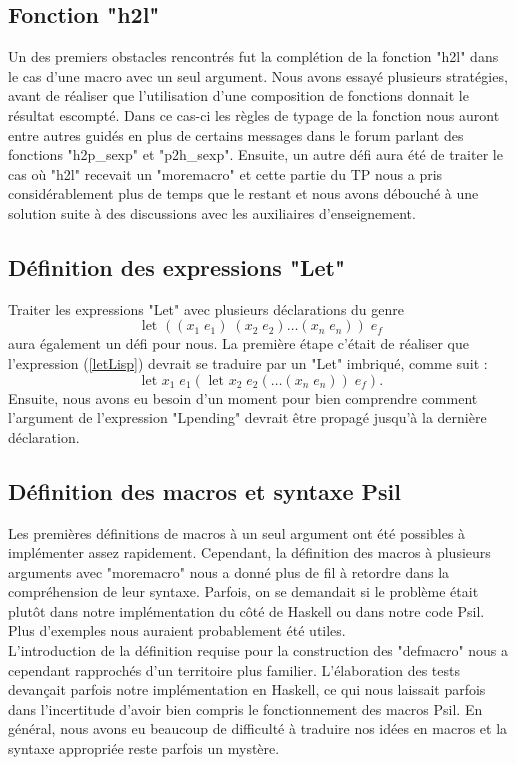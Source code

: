 \documentclass[11pt, letterpaper]{article}
\begin{document}
 \subsection{Fonction "h2l"} 
 Un des premiers obstacles rencontrés fut la complétion de la fonction "h2l" dans le cas d'une macro avec un seul argument. Nous avons essayé plusieurs stratégies, avant de réaliser que l'utilisation d'une composition de fonctions donnait le résultat escompté. Dans ce cas-ci les règles de typage de la fonction nous auront entre autres guidés en plus de certains messages dans le forum parlant des fonctions "h2p\_sexp" et "p2h\_sexp". Ensuite, un autre défi aura été de traiter le cas où "h2l" recevait un "moremacro" et cette partie du TP nous a pris considérablement plus de temps que le restant et nous avons débouché à une solution suite à des discussions avec les auxiliaires d'enseignement.
 
 \subsection{Définition des expressions "Let"} 
 Traiter les expressions "Let" avec plusieurs déclarations du genre
 \begin{equation}\label{letLisp}
  \mbox{ let } ((x_1 \; e_1) \; (x_2 \; e_2) \ldots (x_n \; e_n)) \; e_f
 \end{equation}
 aura également un défi pour nous. La première étape c'était de réaliser que l'expression (\ref{letLisp})
 devrait se traduire par un "Let" imbriqué, comme suit :
 \begin{equation*}
  \mbox{ let } x_1 \; e_1 ( \mbox{ let } x_2 \; e_2 ( \ldots (x_n \; e_n))\; e_f).
 \end{equation*}
 Ensuite, nous avons eu besoin d'un moment pour bien comprendre comment l'argument de l'expression "Lpending" devrait être propagé jusqu'à la dernière déclaration.
 
 \subsection{Définition des macros et syntaxe Psil} 
 Les premières définitions de macros à un seul argument ont été possibles à implémenter assez rapidement. Cependant, la définition des macros à plusieurs arguments avec "moremacro" nous a donné plus de fil à retordre dans la compréhension de leur syntaxe. Parfois, on se demandait si le problème était plutôt dans notre implémentation du côté de Haskell ou dans notre code Psil. Plus d'exemples nous auraient probablement été utiles.\\ 
 L'introduction de la définition requise pour la construction des "defmacro" nous a cependant rapprochés d'un territoire plus familier. L'élaboration des tests devançait parfois notre implémentation en Haskell, ce qui nous laissait parfois dans l'incertitude d'avoir bien compris le fonctionnement des macros Psil. En général, nous avons eu beaucoup de difficulté à traduire nos idées en macros et la syntaxe appropriée reste parfois un mystère.
 
\end{document}
